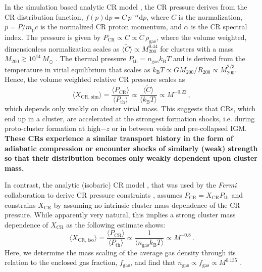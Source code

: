 \documentclass[10pt,aps,pra,reprint,amsmath,amsfonts,amssymb,showpacs,nofootinbib,floatfix]{revtex4-1}
\def\C#1{{\bf #1}}
\newcommand{\Fermi}{{\em Fermi}\xspace}
\newcommand{\rmn}{\mathrm}
\newcommand{\msun}{M_\odot}
\newcommand{\B}{\rmn{B}}
\newcommand{\bra}{\langle}
\newcommand{\ket}{\rangle}
\newcommand{\dd}{\rmn{d}}
\newcommand{\CR}{\rmn{CR}}
\newcommand{\mvir}{M_{200}}
\begin{document}
In the simulation based analytic CR model \cite{2010MNRAS.409..449P},
the CR pressure derives from the CR distribution function, $f(p)\dd p =
C\,p^{-\alpha}\dd p$, where $C$ is the normalization, $p=P/m_\rmn{p}
c$ is the normalized CR proton momentum, and $\alpha$ is the CR
spectral index. The pressure is given by $P_\CR \propto C\propto
\tilde{C} \,\rho_\rmn{gas}$, where the volume weighted, dimensionless
normalization scales as $\bra\tilde{C}\ket\propto \mvir^{0.44}$ for clusters
with a mass $\mvir\gtrsim 10^{14}\,\msun$
\cite{2010MNRAS.409..449P}. The thermal pressure $P_\rmn{th} =
n_\rmn{gas} k_\B T$ and is derived from the temperature in virial
equilibrium that scales as $k_\B T \propto G \mvir/R_{200} \propto
\mvir^{2/3}$. Hence, the volume weighted relative CR pressure scales
as
\begin{equation}
    \bra X_{\CR,\,\rmn{sim}}\ket = \frac{\bra P_\CR\ket}{\bra
      P_\rmn{th}\ket} \propto \frac{\bra\tilde{C}\ket}{\bra k_\B
      T\ket} \propto M^{-0.22}\,,
\end{equation}
which depends only weakly on cluster virial mass. This suggests that
CRs, which end up in a cluster, are accelerated at the strongest
formation shocks, i.e. during proto-cluster formation at high$-z$ or
in between voids and pre-collapsed IGM. \C{These CRs experience a
similar transport history in the form of adiabatic compression or
encounter shocks of similarly (weak) strength so that their
distribution becomes only weakly dependent upon cluster mass.}

In contrast, the analytic (isobaric) CR model
\cite{2004A&A...413...17P}, that was used by the \Fermi collaboration
to derive CR pressure constraints \cite{2010ApJ...717L..71A}, assumes
$P_\CR = X_\CR P_\rmn{th}$ and constrains $X_\CR$ by assuming no
intrinsic cluster mass dependence of the CR pressure. While
apparently very natural, this implies a strong cluster mass dependence
of $X_\CR$ as the following estimate shows:
\begin{equation}
    \bra X_{\CR,\,\rmn{iso}}\ket = \frac{\bra P_\CR\ket}{\bra P_\rmn{th}\ket}
    \propto \frac{1}{\bra n_\rmn{gas} k_\B T\ket} \propto M^{-0.8}\,.
\end{equation}
Here, we determine the mass scaling of the average gas density through
its relation to the enclosed gas fraction, $f_\rmn{gas}$, and find
that $n_\rmn{gas}\propto f_\rmn{gas} \propto M^{0.135}$
\cite{2009ApJ...693.1142S}.
\end{document}
